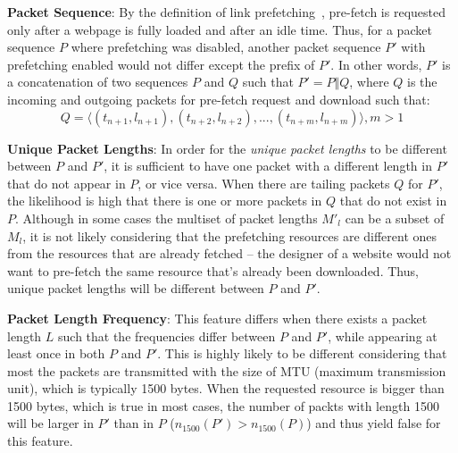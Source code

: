 {\bf Packet Sequence}:
By the definition of link prefetching~\cite{fisher2004link}, pre-fetch is requested only after a webpage is fully loaded and after an idle time.
Thus, for a packet sequence $P$ where prefetching was disabled, another packet sequence $P'$ with prefetching enabled would not differ except the prefix of $P'$.
In other words, $P'$ is a concatenation of two sequences $P$ and $Q$ such that $P' = P \Vert Q$, where $Q$ is the incoming and outgoing packets for pre-fetch request and download such that:
\begin{equation}
Q = \langle(t_{n+1}, l_{n+1}), (t_{n+2}, l_{n+2}), ..., (t_{n+m}, l_{n+m})\rangle, m > 1
\end{equation}

{\bf Unique Packet Lengths}: 
In order for the {\it unique packet lengths} to be different between $P$ and $P'$, it is sufficient to have one packet with a different length in $P'$ that do not appear in $P$, or vice versa.
When there are tailing packets $Q$ for $P'$, the likelihood is high that there is one or more packets in $Q$ that do not exist in $P$.
Although in some cases the multiset of packet lengths $M'_l$ can be a subset of $M_l$, it is not likely considering that the prefetching resources are different ones from the resources that are already fetched -- the designer of a website would not want to pre-fetch the same resource that's already been downloaded.
Thus, unique packet lengths will be different between $P$ and $P'$.

{\bf Packet Length Frequency}:
This feature differs when there exists a packet length $L$ such that the frequencies differ between $P$ and $P'$, while appearing at least once in both $P$ and $P'$.
This is highly likely to be different considering that most the packets are transmitted with the size of MTU (maximum transmission unit), which is typically 1500 bytes.
When the requested resource is bigger than 1500 bytes, which is true in most cases, the number of packts with length 1500 will be larger in $P'$ than in $P$ ($n_{1500}(P') > n_{1500}(P)$) and thus yield false for this feature.

